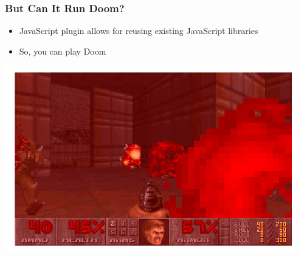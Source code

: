 \begin{frame}
  \frametitle{But Can It Run Doom?}
  \begin{itemize}
    \item JavaScript plugin allows for reusing existing JavaScript libraries
    \item So, you can play Doom
  \end{itemize}
\end{frame}

\begin{frame}
  \begin{center}
    \includegraphics[width=0.95\textwidth]{./pics/doom.png}
  \end{center}
\end{frame}
